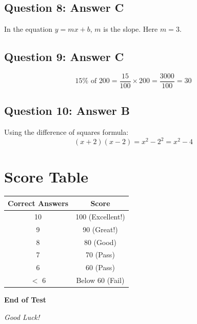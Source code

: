 \documentclass[12pt]{article}
\begin{document}
\subsection*{Question 8: Answer C}
In the equation $y = mx + b$, $m$ is the slope. Here $m = 3$.

\subsection*{Question 9: Answer C}
$$15\% \text{ of } 200 = \frac{15}{100} \times 200 = \frac{3000}{100} = 30$$

\subsection*{Question 10: Answer B}
Using the difference of squares formula:
$$(x + 2)(x - 2) = x^2 - 2^2 = x^2 - 4$$

\vspace{2em}

\section*{Score Table}

\begin{center}
\begin{tabular}{|c|c|}
\hline
\textbf{Correct Answers} & \textbf{Score} \\
\hline
10 & 100 (Excellent!) \\
9 & 90 (Great!) \\
8 & 80 (Good) \\
7 & 70 (Pass) \\
6 & 60 (Pass) \\
$<$ 6 & Below 60 (Fail) \\
\hline
\end{tabular}
\end{center}

\vfill

\begin{center}
\textbf{End of Test}

\textit{Good Luck!}
\end{center}
\end{document}
